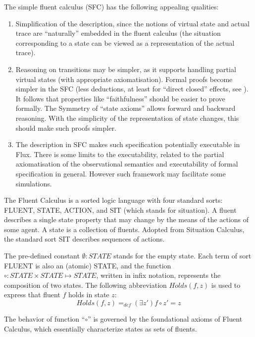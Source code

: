 \vspace{1mm}
The simple fluent calculus (SFC) has the following appealing qualities:
\begin{enumerate} [-]
\item Simplification of the description, since the notions of virtual state and actual trace are ``naturally'' embedded in the fluent calculus (the situation corresponding to a state can be viewed as a representation of the actual trace).

\item Reasoning on transitions may be simpler, as it supports handling partial virtual states (with appropriate axiomatisation). Formal proofs become simpler in the SFC  (less deductions, at least for ``direct closed'' effects, see \cite{thielscher1999situation,framepb03}). It follows that properties like ``faithfulness'' \cite{deransart2007observational} should be easier to prove formally. The Symmetry of ``state axioms'' allows forward and backward reasoning. With the simplicity of the representation of state changes, this should make such proofs simpler.

\item The description in SFC makes such specification potentially executable in Flux. There is some limits to the executability, related to the partial axiomatisation of the observational semantics and executability of formal specification in general. However such framework may facilitate some simulations.

\end{enumerate}

The Fluent Calculus is a sorted logic language with four standard sorts: FLUENT,
STATE, ACTION, and SIT (which stands for situation). A fluent describes a single state property
that may change by the means of the actions of some agent. A state is a collection of fluents.
Adopted from Situation Calculus, the standard sort SIT describes sequences of actions.

The pre-defined constant $\emptyset : STATE$ stands for the empty state. Each
term of sort FLUENT is also an (atomic) STATE, and the function $\circ : STATE
\times STATE \mapsto STATE$, written in infix notation, represents the composition
of two states. The following abbreviation $Holds(f, z)$ is used to express that
fluent $f$ holds in state $z$:
\begin{equation}
Holds(f, z) =_{def} (\exists z') f \circ z' = z
\end{equation}

The behavior of function ``$\circ$'' is governed by the
foundational axioms of Fluent Calculus, which essentially characterize states as sets of fluents.

